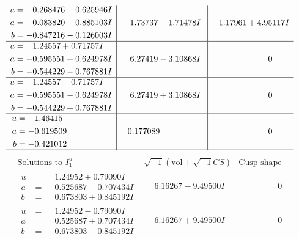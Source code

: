 \documentclass[1p]{elsarticle_modified}
\theoremstyle{definition}
\newcommand{\I}{\sqrt{-1}}
\begin{document}
$$\begin{array}{c|c|c}
\begin{aligned}
u &= -0.268476 - 0.625946 I \\
a &= -0.083820 + 0.885103 I \\
b &= -0.847216 - 0.126003 I\end{aligned}
 & -1.73737 - 1.71478 I & -1.17961 + 4.95117 I \\ \hline\begin{aligned}
u &= \phantom{-}1.24557 + 0.71757 I \\
a &= -0.595551 + 0.624978 I \\
b &= -0.544229 - 0.767881 I\end{aligned}
 & \phantom{-}6.27419 - 3.10868 I & \phantom{-0.000000 } 0 \\ \hline\begin{aligned}
u &= \phantom{-}1.24557 - 0.71757 I \\
a &= -0.595551 - 0.624978 I \\
b &= -0.544229 + 0.767881 I\end{aligned}
 & \phantom{-}6.27419 + 3.10868 I & \phantom{-0.000000 } 0 \\ \hline\begin{aligned}
u &= \phantom{-}1.46415\phantom{ +0.000000I} \\
a &= -0.619509\phantom{ +0.000000I} \\
b &= -0.421012\phantom{ +0.000000I}\end{aligned}
 & \phantom{-}0.177089\phantom{ +0.000000I} & \phantom{-0.000000 } 0\\
 \hline 
 \end{array}$$\newpage$$\begin{array}{c|c|c}  
\text{Solutions to }I^u_{1}& \I (\text{vol} + \sqrt{-1}CS) & \text{Cusp shape}\\
 \hline 
\begin{aligned}
u &= \phantom{-}1.24952 + 0.79090 I \\
a &= \phantom{-}0.525687 - 0.707434 I \\
b &= \phantom{-}0.673803 + 0.845192 I\end{aligned}
 & \phantom{-}6.16267 - 9.49500 I & \phantom{-0.000000 } 0 \\ \hline\begin{aligned}
u &= \phantom{-}1.24952 - 0.79090 I \\
a &= \phantom{-}0.525687 + 0.707434 I \\
b &= \phantom{-}0.673803 - 0.845192 I\end{aligned}
 & \phantom{-}6.16267 + 9.49500 I & \phantom{-0.000000 } 0 \\ \hline\begin{aligned}

\end{aligned}
\end{array}$$
\end{document}
